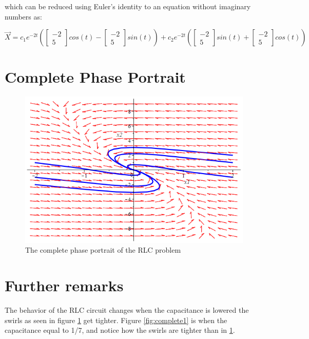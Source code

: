 \documentclass[12pt]{report}
\begin{document}
which can be reduced using Euler's identity to an equation without imaginary numbers as:

$$\vec{X} = c_1e^{-2t} \left(\begin{bmatrix}
-2\\5
\end{bmatrix}cos(t)-\begin{bmatrix}
-2\\5
\end{bmatrix}sin(t)\right)+c_2e^{-2t} \left(\begin{bmatrix}
-2\\5
\end{bmatrix}sin(t)+\begin{bmatrix}
-2\\5
\end{bmatrix}cos(t)\right)$$

\newpage

\section{Complete Phase Portrait}
\begin{figure}[h]
    \centering
    \includegraphics[width=5in]{complete.png}
    \caption{The complete phase portrait of the RLC problem}
    \label{fig:complete}
\end{figure}

\newpage

\section{Further remarks}
The behavior of the RLC circuit changes when the capacitance is lowered the swirls as seen in figure \ref{fig:complete} get tighter. Figure \ref{fig:complete1} is when the capacitance equal to 1/7, and notice how the swirls are tighter than in \ref{fig:complete}.
\end{document}
